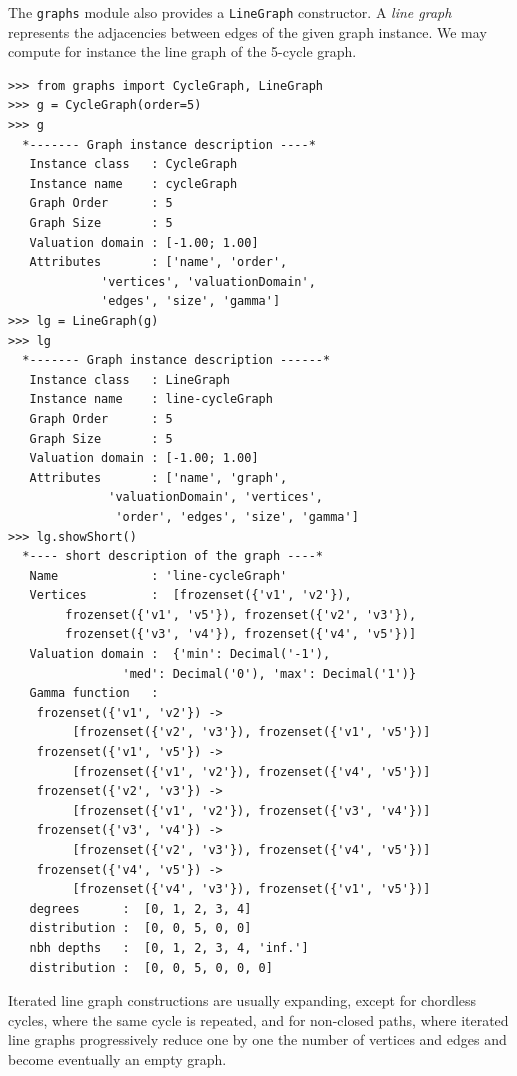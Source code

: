 The \texttt{graphs} module also provides a \texttt{LineGraph} constructor. A \emph{line graph} represents the adjacencies between edges of the given graph instance. We may compute for instance the line graph of the 5-cycle graph.
\begin{lstlisting}
>>> from graphs import CycleGraph, LineGraph
>>> g = CycleGraph(order=5)
>>> g
  *------- Graph instance description ----*
   Instance class   : CycleGraph
   Instance name    : cycleGraph
   Graph Order      : 5
   Graph Size       : 5
   Valuation domain : [-1.00; 1.00]
   Attributes       : ['name', 'order',
             'vertices', 'valuationDomain',
             'edges', 'size', 'gamma']
>>> lg = LineGraph(g)
>>> lg
  *------- Graph instance description ------*
   Instance class   : LineGraph
   Instance name    : line-cycleGraph
   Graph Order      : 5
   Graph Size       : 5
   Valuation domain : [-1.00; 1.00]
   Attributes       : ['name', 'graph',
              'valuationDomain', 'vertices',
               'order', 'edges', 'size', 'gamma']
>>> lg.showShort()
  *---- short description of the graph ----*
   Name             : 'line-cycleGraph'
   Vertices         :  [frozenset({'v1', 'v2'}),
        frozenset({'v1', 'v5'}), frozenset({'v2', 'v3'}),
        frozenset({'v3', 'v4'}), frozenset({'v4', 'v5'})]
   Valuation domain :  {'min': Decimal('-1'),
                'med': Decimal('0'), 'max': Decimal('1')}
   Gamma function   : 
    frozenset({'v1', 'v2'}) ->
         [frozenset({'v2', 'v3'}), frozenset({'v1', 'v5'})]
    frozenset({'v1', 'v5'}) ->
         [frozenset({'v1', 'v2'}), frozenset({'v4', 'v5'})]
    frozenset({'v2', 'v3'}) ->
         [frozenset({'v1', 'v2'}), frozenset({'v3', 'v4'})]
    frozenset({'v3', 'v4'}) ->
         [frozenset({'v2', 'v3'}), frozenset({'v4', 'v5'})]
    frozenset({'v4', 'v5'}) ->
         [frozenset({'v4', 'v3'}), frozenset({'v1', 'v5'})]
   degrees      :  [0, 1, 2, 3, 4]
   distribution :  [0, 0, 5, 0, 0]
   nbh depths   :  [0, 1, 2, 3, 4, 'inf.']
   distribution :  [0, 0, 5, 0, 0, 0]
\end{lstlisting}

Iterated line graph constructions are usually expanding, except for chordless cycles, where the same cycle is repeated, and for non-closed paths, where iterated line graphs progressively reduce one by one the number of vertices and edges and become eventually an empty graph.

